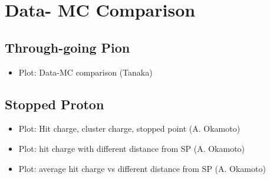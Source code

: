 \section{Data- MC Comparison}
\subsection{Through-going Pion}
\begin{itemize}
\item Plot: Data-MC comparison  (Tanaka)
\end{itemize}

\subsection{Stopped Proton}
\begin{itemize}
\item Plot: Hit charge, cluster charge, stopped point  (A. Okamoto)
\item Plot: hit charge with different distance from SP   (A. Okamoto)
\item Plot: average hit charge vs different distance from SP   (A. Okamoto)
\end{itemize}





